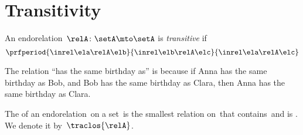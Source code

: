 
\section{Transitivity}

\begin{ctdefinition}
    \label{def:endo_transitive}
    An endorelation~$\relA\colon \setA\mto \setA$ is \emph{transitive} if
    \begin{equation}\label{eq:transitive}
        \prfperiod{
            \inrel \ela \relA \elb
        }{
            \inrel \elb \relA \elc
        }{
            \inrel \ela \relA \elc
        }
    \end{equation}
\end{ctdefinition}

\begin{example}
    The relation ``has the same birthday as'' is  because if Anna has the same birthday as Bob, and Bob has the same birthday as Clara, then Anna has the same birthday as Clara.
\end{example}

\begin{ctdefinition}
    \label{def:transitive-closure}
    The  of an endorelation~\relA on a set~\setA is the smallest relation on~\setA that contains~\relA and is .
    We denote it by~$\traclos{\relA}$.
\end{ctdefinition}


